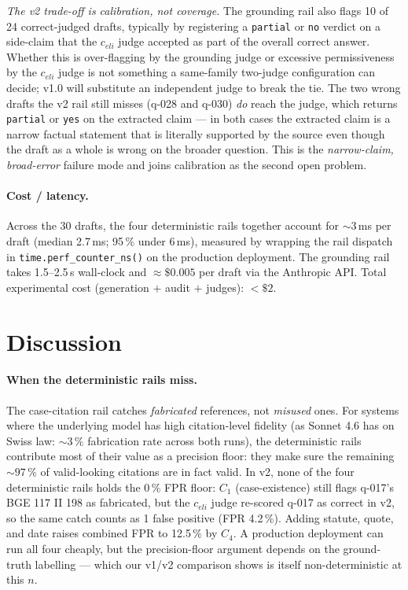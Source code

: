 \documentclass[11pt,a4paper]{article}
\begin{document}
\emph{The v2 trade-off is calibration, not coverage.}
The grounding rail also flags 10 of 24 correct-judged drafts,
typically by registering a \texttt{partial} or \texttt{no}
verdict on a side-claim that the $c_{eli}$ judge accepted as
part of the overall correct answer.  Whether this is
over-flagging by the grounding judge or excessive
permissiveness by the $c_{eli}$ judge is not something a
same-family two-judge configuration can decide; v1.0 will
substitute an independent judge to break the tie.  The two
wrong drafts the v2 rail still misses (q-028 and q-030)
\emph{do} reach the judge, which returns \texttt{partial} or
\texttt{yes} on the extracted claim --- in both cases the
extracted claim is a narrow factual statement that is
literally supported by the source even though the draft as a
whole is wrong on the broader question.  This is the
\emph{narrow-claim, broad-error} failure mode and joins
calibration as the second open problem.

\paragraph{Cost / latency.}
Across the 30 drafts, the four deterministic rails
together account for ${\sim}3$\,ms per draft (median
2.7\,ms; 95\,\% under 6\,ms), measured by wrapping
the rail dispatch in
\texttt{time.perf\_counter\_ns()} on the production
deployment.  The grounding rail takes 1.5--2.5\,s
wall-clock and ${\approx}\$0.005$ per draft via the
Anthropic API.  Total experimental cost (generation
$+$ audit $+$ judges): ${<\!}\$2$.


\section{Discussion}
\label{sec:discussion}

\paragraph{When the deterministic rails miss.}
The case-citation rail catches \emph{fabricated}
references, not \emph{misused} ones.  For systems
where the underlying model has high citation-level
fidelity (as Sonnet 4.6 has on Swiss law: $\sim 3\,\%$
fabrication rate across both runs), the deterministic
rails contribute most of their value as a precision
floor: they make sure the remaining $\sim 97\,\%$ of
valid-looking citations are in fact valid.  In v2,
none of the four deterministic rails holds the 0\,\%
FPR floor: $C_1$ (case-existence) still flags
q-017's BGE 117 II 198 as fabricated, but the
$c_{eli}$ judge re-scored q-017 as correct in v2, so
the same catch counts as 1 false positive (FPR
4.2\,\%).  Adding statute, quote, and date raises
combined FPR to 12.5\,\% by $C_4$.  A production
deployment can run all four cheaply, but the
precision-floor argument depends on the
ground-truth labelling --- which our v1/v2 comparison
shows is itself non-deterministic at this $n$.
\end{document}
